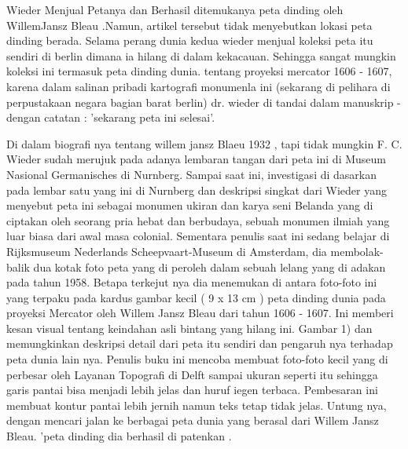 Wieder Menjual Petanya dan Berhasil ditemukanya peta dinding oleh WillemJansz Bleau .Namun, artikel tersebut tidak menyebutkan lokasi peta dinding berada. 
Selama perang dunia kedua wieder menjual koleksi peta itu sendiri di berlin dimana ia hilang di dalam kekacauan. 
Sehingga sangat mungkin koleksi ini termasuk peta dinding dunia. tentang proyeksi mercator 1606 - 1607, 
karena dalam salinan pribadi kartografi monumenla ini (sekarang di pelihara di perpustakaan negara bagian barat berlin) 
dr. wieder di tandai dalam manuskrip - dengan catatan : 'sekarang peta ini selesai'. 


Di dalam biografi nya tentang willem jansz Blaeu 1932 , tapi tidak mungkin F. C. Wieder sudah merujuk pada adanya lembaran tangan dari 
peta ini di Museum Nasional Germanisches di Nurnberg. Sampai saat ini, investigasi di dasarkan pada lembar satu yang ini di Nurnberg dan deskripsi singkat dari Wieder yang menyebut peta ini sebagai monumen ukiran 
dan karya seni Belanda yang di ciptakan oleh seorang pria hebat dan berbudaya, sebuah monumen ilmiah yang luar biasa dari awal masa colonial. 
Sementara penulis saat ini sedang belajar di Rijksmuseum Nederlands Scheepvaart-Museum di Amsterdam, 
dia membolak-balik dua kotak foto peta yang di peroleh dalam sebuah lelang yang di adakan pada tahun 1958. 
Betapa terkejut nya dia menemukan di antara foto-foto ini yang terpaku pada kardus gambar kecil ( 9 x 13 cm ) 
peta dinding dunia pada proyeksi Mercator oleh Willem Jansz Bleau dari tahun 1606 - 1607. 
Ini memberi kesan visual tentang keindahan asli bintang yang hilang ini. 
Gambar 1) dan memungkinkan deskripsi detail dari peta itu sendiri dan pengaruh nya terhadap peta dunia lain nya. 
Penulis buku ini mencoba membuat foto-foto kecil yang di perbesar oleh Layanan Topografi di Delft sampai ukuran seperti itu 
sehingga garis pantai bisa menjadi lebih jelas dan huruf iegen terbaca. 
Pembesaran ini membuat kontur pantai lebih jernih namun teks tetap tidak jelas. 
Untung nya, dengan mencari jalan ke berbagai peta dunia yang berasal dari Willem Jansz Bleau. 'peta dinding dia berhasil di patenkan \cite{campbell1976descriptive}.

